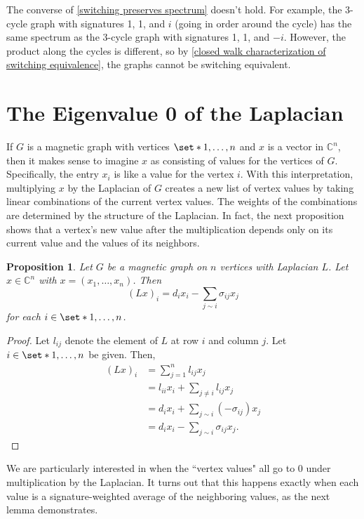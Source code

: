 \documentclass[12pt]{article}
\newtheorem{prop}[thm]{Proposition}
\theoremstyle{definition}
\newcommand{\C}{\mathbb C}
\begin{document}
The converse of \cref{switching preserves spectrum} doesn't hold. For example, the 3-cycle graph with signatures 1, 1, and $i$ (going in order around the cycle) has the same spectrum as the 3-cycle graph with signatures 1, 1, and $-i$. However, the product along the cycles is different, so by \cref{closed walk characterization of switching equivalence}, the graphs cannot be switching equivalent. 

\section{The Eigenvalue 0 of the Laplacian}

If $G$ is a magnetic graph with vertices $\set*{1, \dots, n}$ and $x$ is a vector in $\C^n$, then it makes sense to imagine $x$ as consisting of values for the vertices of $G$. Specifically, the entry $x_i$ is like a value for the vertex $i$. With this interpretation, multiplying $x$ by the Laplacian of $G$ creates a new list of vertex values by taking linear combinations of the current vertex values. The weights of the combinations are determined by the structure of the Laplacian. In fact, the next proposition shows that a vertex's new value after the multiplication depends only on its current value and the values of its neighbors.   


\begin{prop}\label{Laplacian times vector}
Let $G$ be a magnetic graph on $n$ vertices with Laplacian $L$. Let $x \in \C^n$ with $x = (x_1, \dots, x_n)$. Then
$$(Lx)_i = d_ix_i - \sum_{j \sim i} \sigma_{ij} x_j$$
for each $i \in \set*{1, \dots, n}$.
\end{prop}
\begin{proof}
Let $l_{ij}$ denote the element of $L$ at row $i$ and column $j$. Let $i \in \set*{1, \dots, n}$ be given. Then,
\begin{align*}
(Lx)_i &= \sum_{j=1}^n l_{ij}x_j \\
&= l_{ii}x_i + \sum_{j \neq i} l_{ij}x_j \\
&= d_i x_i + \sum_{j \sim i} (-\sigma_{ij})x_j \\
&= d_i x_i - \sum_{j \sim i} \sigma_{ij}x_j.
\end{align*}
\end{proof}

We are particularly interested in when the ``vertex values" all go to 0 under multiplication by the Laplacian. It turns out that this happens exactly when each value is a signature-weighted average of the neighboring values, as the next lemma demonstrates.
\end{document}
